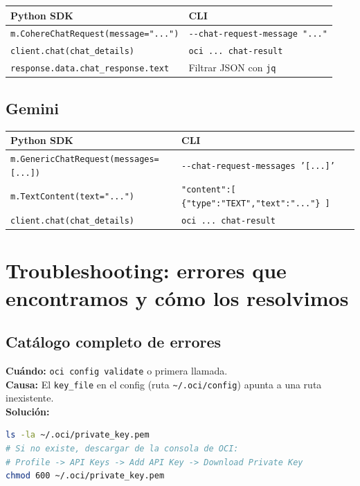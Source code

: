 \documentclass[11pt,a4paper,oneside]{article}
\begin{document}
\begin{center}
\begin{tabular}{@{}p{6cm}p{8cm}@{}}
\toprule
\textbf{Python SDK} & \textbf{CLI} \\
\midrule
\rowcolor{codebg}
\texttt{m.CohereChatRequest(message="...")} & \texttt{-{}-chat-request-message "..."} \\
\texttt{client.chat(chat\_details)} & \texttt{oci ... chat-result} \\
\texttt{response.data.chat\_response.text} & Filtrar JSON con \texttt{jq} \\
\bottomrule
\end{tabular}
\end{center}

\subsection{Gemini}

\begin{center}
\begin{tabular}{@{}p{6cm}p{8cm}@{}}
\toprule
\textbf{Python SDK} & \textbf{CLI} \\
\midrule
\rowcolor{codebg}
\texttt{m.GenericChatRequest(messages=[...])} & \texttt{-{}-chat-request-messages '[...]'} \\
\texttt{m.TextContent(text="...")} & \texttt{"content":[ \{"type":"TEXT","text":"..."\} ]} \\
\texttt{client.chat(chat\_details)} & \texttt{oci ... chat-result} \\
\bottomrule
\end{tabular}
\end{center}

\section{Troubleshooting: errores que encontramos y cómo los resolvimos}

\subsection{Catálogo completo de errores}

\begin{tcolorbox}[colback=errred!5!white,colframe=errred,breakable,title={Error 1: ``No such file or directory: private\_key.pem''}]
\textbf{Cuándo:} \texttt{oci config validate} o primera llamada. \\
\textbf{Causa:} El \texttt{key\_file} en el config (ruta \texttt{\textasciitilde/.oci/config}) apunta a una ruta inexistente. \\
\textbf{Solución:}
\begin{lstlisting}[language=bash]
ls -la ~/.oci/private_key.pem
# Si no existe, descargar de la consola de OCI:
# Profile -> API Keys -> Add API Key -> Download Private Key
chmod 600 ~/.oci/private_key.pem
\end{lstlisting}
\end{tcolorbox}
\end{document}
